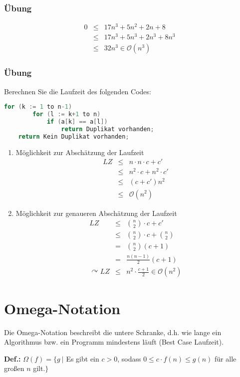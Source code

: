 \subsubsection{Übung}
\begin{eqnarray*}
	0	&\leq& 17n^3 + 5n^2 + 2n + 8 \\
		&\leq& 17n^3 + 5n^3 + 2n^3 + 8n^3 \\
		&\leq& 32n^3 \in \mathcal{O}(n^3)
\end{eqnarray*}

\subsubsection{Übung}
Berechnen Sie die Laufzeit des folgenden Codes:
\begin{lstlisting}[language=java, caption={Pseudocode zur Berechnung der Laufzeit}]
	for (k := 1 to n-1)
		for (l := k+1 to n)
			if (a[k] == a[l])
				return Duplikat vorhanden;
	return Kein Duplikat vorhanden;
\end{lstlisting}
\begin{enumerate}
	\item Möglichkeit zur Abschätzung der Laufzeit
		\begin{eqnarray*}
		LZ 	&\leq& n \cdot n \cdot c + c'	\\
			&\leq& n^2 \cdot c + n^2 \cdot c'	\\
			&\leq& (c+c') n^2				\\
			&\leq& \mathcal{O}(n^{2})
		\end{eqnarray*}
	\item Möglichkeit zur genaueren Abschätzung der Laufzeit
	\begin{eqnarray*}
		LZ	&\leq& \binom{n}{2} \cdot c + c' \\
			&\leq& \binom{n}{2} \cdot c + \binom{n}{2} \\
			&=& \binom{n}{2}(c+1)	\\
			&=& \frac{n(n-1)}{2}(c+1)	\\
	\curvearrowright LZ &\leq& n^{2} \cdot \frac{c+1}{2} \in \mathcal{O}(n^{2})
	\end{eqnarray*}
\end{enumerate}

\newpage
\section{Omega-Notation}
\label{sec:OmegaNotation}
Die Omega-Notation beschreibt die untere Schranke, d.h. wie lange ein Algorithmus bzw. ein Programm mindestens läuft (Best Case Laufzeit).
\begin{shaded}
	\noindent
	\textbf{Def.:} \(\Omega(f) = \{ g \:|\) Es gibt ein \(c > 0\), sodass \(0 \leq c \cdot f(n) \leq g(n)\) für alle großen \(n\) gilt.\(\}\)
\end{shaded}

